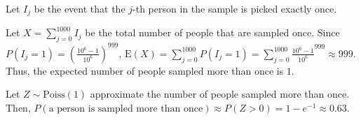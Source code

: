Let $I_{j}$ be the event that the $j$-th person in the sample is picked
exactly once. 

Let $X = \sum_{j=0}^{1000}I_{j}$ be the total number of people that
are sampled once. Since $P(I_{j}=1) = (\frac{10^{6}-1}{10^{6}})^{999}$,
$\text{E}(X) = \sum_{j=0}^{1000}P(I_{j}=1) = \sum_{j=0}^{1000}
\frac{10^{6}-1}{10^{6}}^{999} \approx 999$. Thus, the expected number of
people sampled more than once is $1$.

Let $Z \sim \text{Poiss}(1)$ approximate the number of people sampled more than
once. Then, $P(\text{a person is sampled more than once}) \approx P(Z > 0) = 1 -
e^{-1} \approx 0.63$.